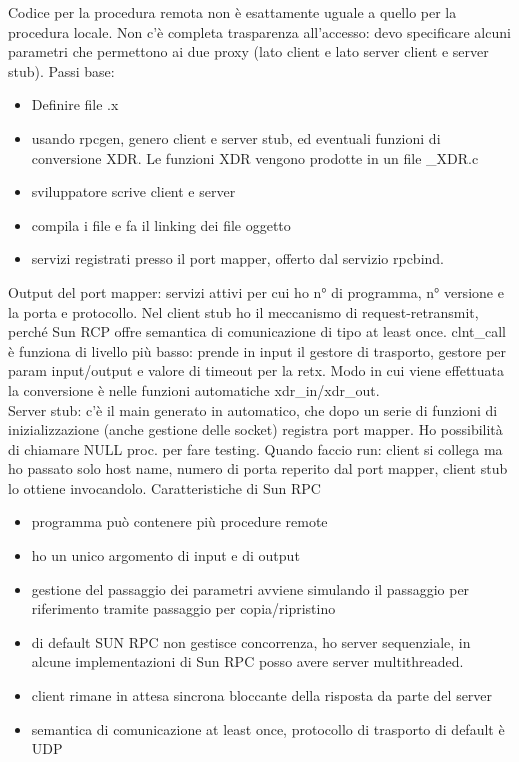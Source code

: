 \documentclass[16px]{article}
\begin{document}
Codice per la procedura remota non è esattamente uguale a quello per la procedura locale. Non c'è completa trasparenza all'accesso: devo specificare alcuni parametri che permettono ai due proxy (lato client e lato server client e server stub).
Passi base:
\begin{itemize}
\item Definire file .x
\item usando rpcgen, genero client e server stub, ed eventuali funzioni di conversione XDR. Le funzioni XDR vengono prodotte in un file \_XDR.c
\item sviluppatore scrive client e server
\item compila i file e fa il linking dei file oggetto
\item servizi registrati presso il port mapper, offerto dal servizio rpcbind.
\end{itemize}
Output del port mapper: servizi attivi per cui ho n° di programma, n° versione e la porta e protocollo. Nel client stub ho il meccanismo di request-retransmit, perché Sun RCP offre semantica di comunicazione di tipo at least once. clnt\_call è funziona di livello più basso: prende in input il gestore di trasporto, gestore per param input/output e valore di timeout per la retx. Modo in cui viene effettuata la conversione è nelle funzioni automatiche xdr\_in/xdr\_out.\\ Server stub: c'è il main generato in automatico, che dopo un serie di funzioni di inizializzazione (anche gestione delle socket) registra port mapper. Ho possibilità di chiamare NULL proc. per fare testing. Quando faccio run: client si collega ma ho passato solo host name, numero di porta reperito dal port mapper, client stub lo ottiene invocandolo. Caratteristiche di Sun RPC
\begin{itemize}
\item programma può contenere più procedure remote
\item ho un unico argomento di input e di output
\item gestione del passaggio dei parametri avviene simulando il passaggio per riferimento tramite passaggio per copia/ripristino
\item di default SUN RPC non gestisce concorrenza, ho server sequenziale, in alcune implementazioni di Sun RPC posso avere server multithreaded.
\item client rimane in attesa sincrona bloccante della risposta da parte del server
\item semantica di comunicazione at least once, protocollo di trasporto di default è UDP
\end{itemize}
\end{document}
